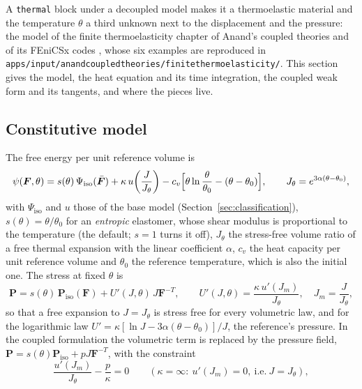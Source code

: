 \documentclass[11pt]{article}
\newcommand{\bP}{\bm{P}}
\newcommand{\bF}{\bm{F}}
\newcommand{\bFb}{\bar{\bm{F}}}
\DeclareRobustCommand{\code}[1]{{\def\_{\textunderscore\allowbreak}\texttt{#1}}}
\DeclareRobustCommand{\file}[1]{{\def\_{\textunderscore\allowbreak}\texttt{#1}}}
\begin{document}
A \code{thermal} block under a decoupled model makes it a thermoelastic
material and the temperature $\theta$ a third unknown next to the
displacement and the pressure: the model of the finite thermoelasticity
chapter of Anand's coupled theories and of its FEniCSx codes
\cite{anandbook}, whose six examples are reproduced in
\file{apps/input/anand\_coupled\_theories/finite\_thermoelasticity/}.  This
section gives the model, the heat equation and its time integration, the
coupled weak form and its tangents, and where the pieces live.

\subsection{Constitutive model}

The free energy per unit reference volume is
\begin{equation}
  \psi(\bF, \theta) = s(\theta)\,\Psi_{\mathrm{iso}}(\bFb) + \kappa\,u\!\left(\frac{J}{J_\theta}\right) - c_v\Bigl[\theta\ln\frac{\theta}{\theta_0} - (\theta - \theta_0)\Bigr],
  \qquad
  J_\theta = e^{3\alpha(\theta - \theta_0)},
  \label{eq:thermoenergy}
\end{equation}
with $\Psi_{\mathrm{iso}}$ and $u$ those of the base model
(Section~\ref{sec:classification}), $s(\theta) = \theta/\theta_0$ for an
\emph{entropic} elastomer, whose shear modulus is proportional to the
temperature (the default; $s = 1$ turns it off), $J_\theta$ the stress-free
volume ratio of a free thermal expansion with the linear coefficient
$\alpha$, $c_v$ the heat capacity per unit reference volume and $\theta_0$
the reference temperature, which is also the initial one.  The stress at
fixed $\theta$ is
\begin{equation}
  \bP = s(\theta)\,\bP_{\mathrm{iso}}(\bF) + U'(J, \theta)\,J\bF^{-T},
  \qquad
  U'(J, \theta) = \frac{\kappa\,u'(J_m)}{J_\theta}, \quad J_m = \frac{J}{J_\theta},
  \label{eq:thermostress}
\end{equation}
so that a free expansion to $J = J_\theta$ is stress free for every
volumetric law, and for the logarithmic law $U' = \kappa[\ln J - 3\alpha(\theta - \theta_0)]/J$,
the reference's pressure.  In the coupled formulation the volumetric term
is replaced by the pressure field, $\bP = s(\theta)\bP_{\mathrm{iso}} + pJ\bF^{-T}$,
with the constraint
\begin{equation}
  \frac{u'(J_m)}{J_\theta} - \frac{p}{\kappa} = 0
  \qquad (\kappa = \infty:\ u'(J_m) = 0,\ \text{i.e.}\ J = J_\theta),
  \label{eq:thermoconstraint}
\end{equation}
\end{document}

